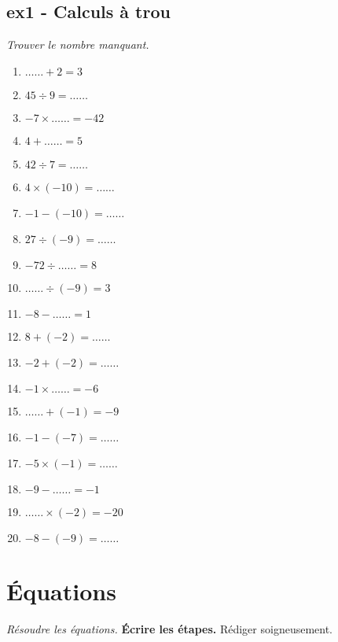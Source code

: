 \documentclass[12pt]{article}
\begin{document}
\subsection*{ex1 - Calculs  à trou}
\textit{Trouver le nombre manquant.}

  \begin{multicols}{3}\noindent
    \begin{enumerate}
    \item $\ldots\ldots + 2 = 3$
    \item $45 \div 9 = \ldots\ldots$
    \item $-7 \times \ldots\ldots = -42$
    \item $4 + \ldots\ldots = 5$
    \item $42 \div 7 = \ldots\ldots$
    \item $4 \times \left( -10\right) = \ldots\ldots$
    \item $-1 - \left( -10\right) = \ldots\ldots$
    \item $27 \div \left( -9\right) = \ldots\ldots$
    \item $-72 \div \ldots\ldots = 8$
    \item $\ldots\ldots \div \left( -9\right) = 3$
    \item $-8 - \ldots\ldots = 1$
    \item $8 + \left( -2\right) = \ldots\ldots$
    \item $-2 + \left( -2\right) = \ldots\ldots$
    \item $-1 \times \ldots\ldots = -6$
    \item $\ldots\ldots + \left( -1\right) = -9$
    \item $-1 - \left( -7\right) = \ldots\ldots$
    \item $-5 \times \left( -1\right) = \ldots\ldots$
    \item $-9 - \ldots\ldots = -1$
    \item $\ldots\ldots \times \left( -2\right) = -20$
    \item $-8 - \left( -9\right) = \ldots\ldots$
    \end{enumerate}
  \end{multicols}

    \section*{Équations}
  \textit{Résoudre les équations.} \textbf{Écrire les étapes.} Rédiger soigneusement.
\end{document}
